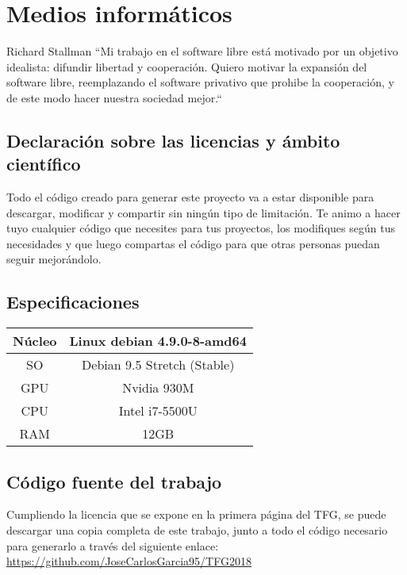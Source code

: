 \chapter*{Medios informáticos}
\begin{chapquote}{Richard Stallman}
	``Mi trabajo en el software libre está motivado por un objetivo idealista: difundir libertad y cooperación. Quiero motivar la expansión del software libre, reemplazando el software privativo que prohibe la cooperación, y de este modo hacer nuestra sociedad mejor.``
\end{chapquote}
\section*{Declaración sobre las licencias y ámbito científico}

Todo el código creado para generar este proyecto va a estar disponible para descargar, modificar y compartir sin ningún tipo de limitación. Te animo a hacer tuyo cualquier código que necesites para tus proyectos, los modifiques según tus necesidades y que luego compartas el código para que otras personas puedan seguir mejorándolo.

\section*{Especificaciones}
\begin{table}[htbp]
	\centering %
	\begin{tabular}{|c|c|}
		
		\hline
		Núcleo & Linux debian 4.9.0-8-amd64  \\ \hline
		SO & Debian 9.5 Stretch (Stable) \\ \hline
		GPU & Nvidia 930M \\ \hline
		CPU & Intel i7-5500U \\ \hline
		RAM & 12GB \\
		\hline
	\end{tabular}
	\label{tab:specs}
\end{table}

\section*{Código fuente del trabajo}
Cumpliendo la licencia que se expone en la primera página del TFG, se puede descargar una copia completa de este trabajo, junto a todo el código necesario para generarlo a través del siguiente enlace: \href{https://github.com/JoseCarlosGarcia95/TFG2018}{https://github.com/JoseCarlosGarcia95/TFG2018}